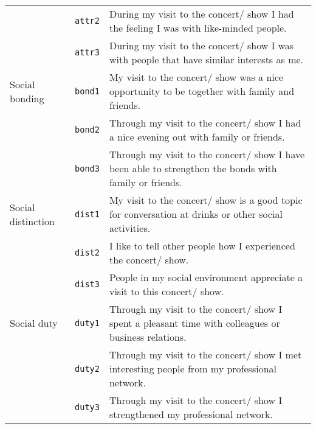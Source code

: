 \begin{longtable}{llp{11cm}}
                            & \texttt{attr2}     & During my visit to the concert/ show I had the feeling I was with like-minded people. \\
                            & \texttt{attr3}     & During my visit to the concert/ show I was with people that have similar interests as me. \\
    \hline
    Social bonding          & \texttt{bond1}     & My visit to the concert/ show was a nice opportunity to be together with family and friends. \\
                            & \texttt{bond2}     & Through my visit to the concert/ show I had a nice evening out with family or friends. \\
                            & \texttt{bond3}     & Through my visit to the concert/ show I have been able to strengthen the bonds with family or friends. \\
    \hline
    Social distinction      & \texttt{dist1}     & My visit to the concert/ show is a good topic for conversation at drinks or other social activities. \\
                            & \texttt{dist2}     & I like to tell other people how I experienced the concert/ show. \\
                            & \texttt{dist3}     & People in my social environment appreciate a visit to this concert/ show. \\
    \hline
    Social duty             & \texttt{duty1}     & Through my visit to the concert/ show I spent a pleasant time with colleagues or business relations. \\
                            & \texttt{duty2}     & Through my visit to the concert/ show I met interesting people from my professional network. \\
                            & \texttt{duty3}     & Through my visit to the concert/ show I strengthened my professional network. \\
\end{longtable}
